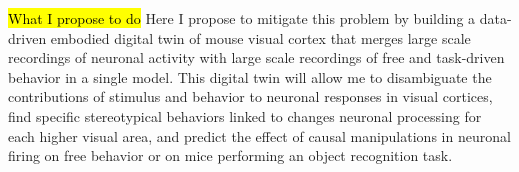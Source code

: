

\hl{What I propose to do} Here I propose to mitigate this problem by building a data-driven embodied digital twin of mouse visual cortex that merges large scale recordings of neuronal activity with large scale recordings of free and task-driven behavior in a single model. 
This digital twin will allow me to  disambiguate the contributions of stimulus and behavior to neuronal responses in visual cortices,  find specific stereotypical behaviors linked to changes neuronal processing for each higher visual area, and  predict the effect of causal manipulations in neuronal firing on free behavior or on mice performing an object recognition task. 
